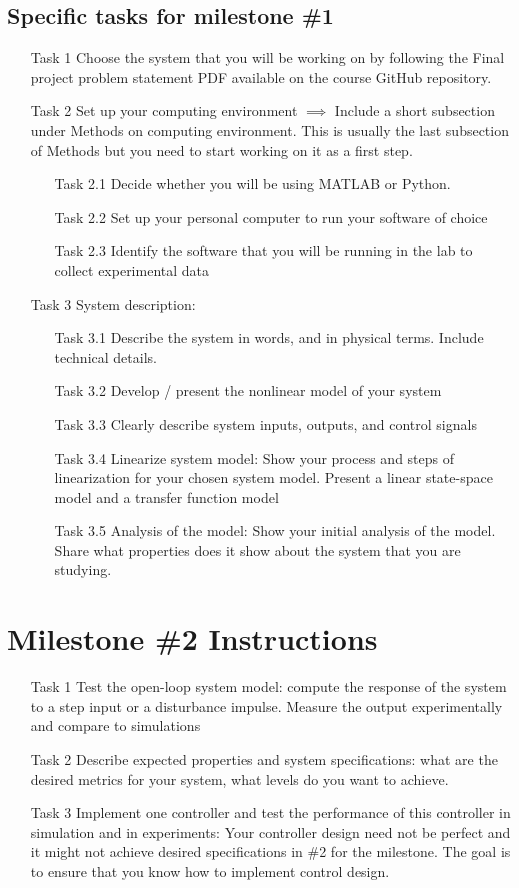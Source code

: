 \documentclass{ee122_notes}
\begin{document}
\subsection{Specific tasks for milestone \#1}
\begin{itemize}
\item[Task 1] Choose the system that you will be working on by following the Final project problem statement PDF available on the course GitHub repository.
\item[Task 2] Set up your computing environment $\implies$ Include a short subsection under Methods on computing environment. This is usually the last subsection of Methods but you need to start working on it as a first step.
\begin{itemize}
\item[Task 2.1] Decide whether you will be using MATLAB or Python. 
\item[Task 2.2] Set up your personal computer to run your software of choice
\item[Task 2.3] Identify the software that you will be running in the lab to collect experimental data
\end{itemize}
\item[Task 3] System description: 
\begin{itemize}
\item[Task 3.1] Describe the system in words, and in physical terms. Include technical details.
\item[Task 3.2] Develop / present the nonlinear model of your system
\item[Task 3.3] Clearly describe system inputs, outputs, and control signals
\item[Task 3.4] Linearize system model: Show your process and steps of linearization for your chosen system model. Present a linear state-space model and a transfer function model
\item[Task 3.5] Analysis of the model: Show your initial analysis of the model. Share what properties does it show about the system that you are studying.
\end{itemize}
\end{itemize}

\section{Milestone \#2 Instructions}
\begin{itemize}
    \item[Task 1] Test the open-loop system model: compute the response of the system to a step input or a disturbance impulse. Measure the output experimentally and compare to simulations
    \item[Task 2] Describe expected properties and system specifications: what are the desired metrics for your system, what levels do you want to achieve.
    \item[Task 3] Implement one controller and test the performance of this controller in simulation and in experiments: Your controller design need not be perfect and it might not achieve desired specifications in \#2 for the milestone. The goal is to ensure that you know how to implement control design.

\end{itemize}
\end{document}
